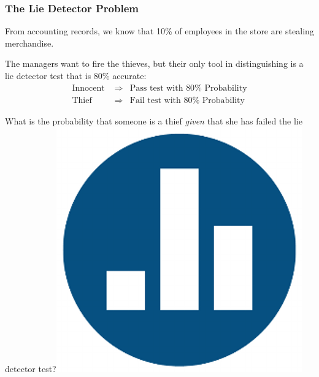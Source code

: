 \documentclass[handout]{beamer}
\begin{document}
\begin{frame}
\frametitle{The Lie Detector Problem}
\begin{block}{From accounting records, we know that 10\% of employees in the store are stealing merchandise.}\end{block}
\begin{block}{The managers want to fire the thieves, but their only tool in distinguishing is a lie detector test that is 80\% accurate:}
	\begin{eqnarray*}
	\mbox{Innocent } &\Rightarrow& \mbox{Pass test with } 80\% \mbox{ Probability}\\
	\mbox{Thief } &\Rightarrow& \mbox{Fail test with } 80\% \mbox{ Probability}
	\end{eqnarray*}
\end{block}

\pause
\begin{alertblock}{What is the probability that someone is a thief \emph{given} that she has failed the lie detector test?\hfill\includegraphics[scale = 0.03]{./images/clicker} }
\end{alertblock}

\end{frame}
\end{document}
